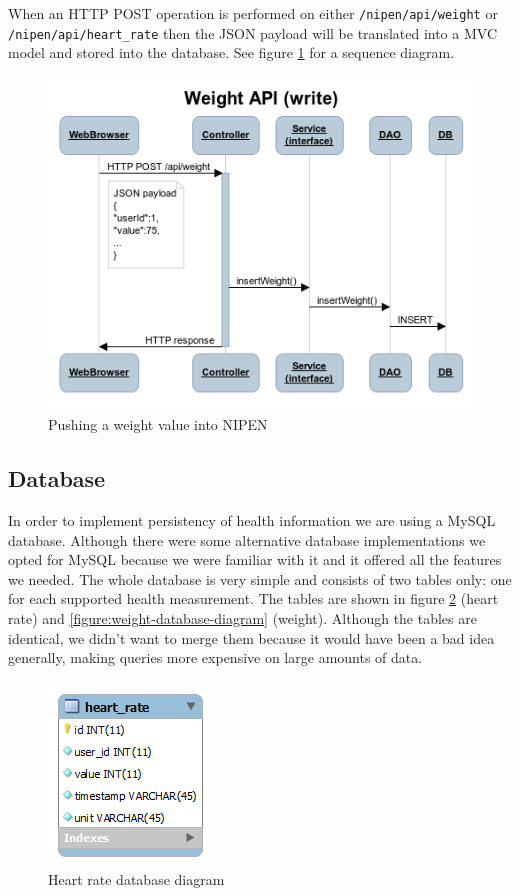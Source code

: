When an HTTP POST operation is performed on either \verb|/nipen/api/weight| or \newline
\verb|/nipen/api/heart_rate| then the JSON payload will be translated into a MVC model and
stored into the database. See figure \ref{figure:seqw} for a sequence diagram.

\begin{figure}[h]
\centering
\includegraphics[scale=0.8]{../Figures/seqw.png}
\caption{Pushing a weight value into NIPEN}
\label{figure:seqw}
\end{figure}


\subsection{Database}

In order to implement persistency of health information we are using a MySQL database.
Although there were some alternative database implementations we opted for MySQL
because we were familiar with it and it offered all the features we needed.
The whole database is very simple and consists of two tables only: one for each supported health measurement.
The tables are shown in figure \ref{figure:heart-rate-database-diagram} (heart rate)
and \ref{figure:weight-database-diagram} (weight).
Although the tables are identical, we didn't want to merge them because it would 
have been a bad idea generally, making queries more expensive on large amounts of data.

\begin{figure}[h]
\centering
\includegraphics[scale=1.0]{../Figures/heart-rate-database-diagram.png}
\caption{Heart rate database diagram}
\label{figure:heart-rate-database-diagram}
\end{figure}

